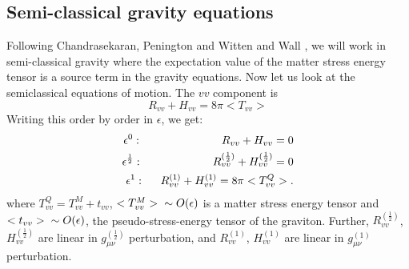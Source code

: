 \documentclass[12pt]{article}
\begin{document}
\subsection{Semi-classical gravity equations }
Following Chandrasekaran, Penington and Witten \cite{VGE} and Wall \cite{AW}, we will work in semi-classical gravity where the expectation value of the matter stress energy tensor is a source term in the gravity equations.
Now let us look at the semiclassical equations of motion. The $vv$ component is
\begin{equation}\label{I16}
R_{vv}+ H_{vv}= 8\pi <T_{vv}>
\end{equation}
Writing this order by order in $\epsilon$, we get:
\begin{eqnarray}
\epsilon^0: \hspace{25mm} R_{vv}+H_{vv}=0   \label{I17} \\
\epsilon^{\frac{1}{2}}: \hspace{22mm} R^{(\frac{1}{2})}_{vv}+H^{(\frac{1}{2})}_{vv}=0  \label{I18}\\
\epsilon^{1} :\hspace{5mm} R^{(1)}_{vv}+ H^{(1)}_{vv}= 8\pi <T^Q_{vv}>.  \label{I19}
\end{eqnarray}
where $T^Q_{vv}=T^M_{vv}+t_{vv}$, $<T^M_{vv}>\hspace{2mm} \sim O(\epsilon)$ is a matter stress energy tensor and $<t_{vv}> \hspace{2mm} \sim O(\epsilon)$, the pseudo-stress-energy tensor of the graviton.
Further, $R^{(\frac{1}{2})}_{vv}$, $H^{(\frac{1}{2})}_{vv}$ are linear in $g_{\mu \nu}^{(\frac{1}{2})}$ perturbation, and $R^{(1)}_{vv}$, $H^{(1)}_{vv}$ are linear in $g_{\mu \nu}^{(1)}$ perturbation.
\end{document}
